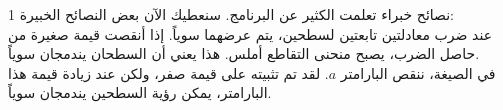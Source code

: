 \begin{surferPage}{1 نصائح خبراء}
تعلمت الكثير عن البرنامج. سنعطيك الآن بعض النصائح الخبيرة:\\
\vspace{0.3cm}
عند ضرب معادلتين تابعتين لسطحين، يتم عرضهما سوياً. إذا أنقصت قيمة صغيرة من حاصل الضرب، يصبح منحنى التقاطع أملس. هذا يعني أن السطحان يندمجان سوياً.\\
\vspace{0.3cm}
في الصيغة، ننقص البارامتر $a$. لقد تم تثبيته على قيمة صفر، ولكن عند زيادة قيمة هذا البارامتر، يمكن رؤية السطحين يندمجان سوياً.
\end{surferPage}
